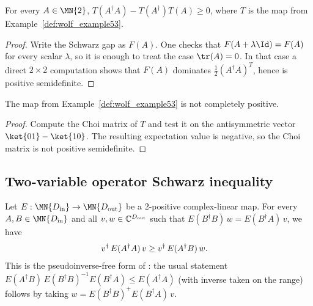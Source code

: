 \begin{theorem}\label{thm:wolf_example53_schwarz}
    \leanok
    For every $A \in \MN{2}$,
    $T(A^\dagger A)-T(A^\dagger)T(A)\ge 0$, where $T$ is the map from
    Example~\ref{def:wolf_example53}.
\end{theorem}

\begin{proof}
    \leanok
    Write the Schwarz gap as $F(A)$.
    One checks that $F(A + \lambda \Id) = F(A)$ for every scalar $\lambda$,
    so it is enough to treat the case $\tr(A) = 0$.
    In that case a direct $2 \times 2$ computation shows that
    $F(A)$ dominates $\frac{1}{2} (A^\dagger A)^T$, hence is positive semidefinite.
\end{proof}

\begin{theorem}\label{thm:wolf_example53_not_cp}
    \leanok
    The map from Example~\ref{def:wolf_example53} is not completely positive.
\end{theorem}

\begin{proof}
    \leanok
    Compute the Choi matrix of $T$ and test it on the antisymmetric vector
    $\ket{01} - \ket{10}$.
    The resulting expectation value is negative, so the Choi matrix is not
    positive semidefinite.
\end{proof}

\subsection{Two-variable operator Schwarz inequality}

\begin{lemma}
    \label{lem:two_variable_operator_schwarz_conditional}
    \leanok
    Let $E:\MN{D_{\rm in}}\to\MN{D_{\rm out}}$ be a $2$-positive
    complex-linear map. For every $A,B\in\MN{D_{\rm in}}$ and all
    $v,w\in\mathbb C^{D_{\rm out}}$ such that
    $E(B^\dagger B)\,w = E(B^\dagger A)\,v$, we have
    \begin{align}
        v^\dagger\,E(A^\dagger A)\,v
         & \ge v^\dagger\,E(A^\dagger B)\,w.
        \notag
    \end{align}
    This is the pseudoinverse-free form of
    \cite[Eq.~(5.4)]{Wolf2012Quantum}: the usual statement
    $E(A^\dagger B)\,E(B^\dagger B)^{-1}E(B^\dagger A)\le E(A^\dagger A)$
    (with inverse taken on the range) follows by taking
    $w = E(B^\dagger B)^{+}E(B^\dagger A)\,v$.
\end{lemma}

